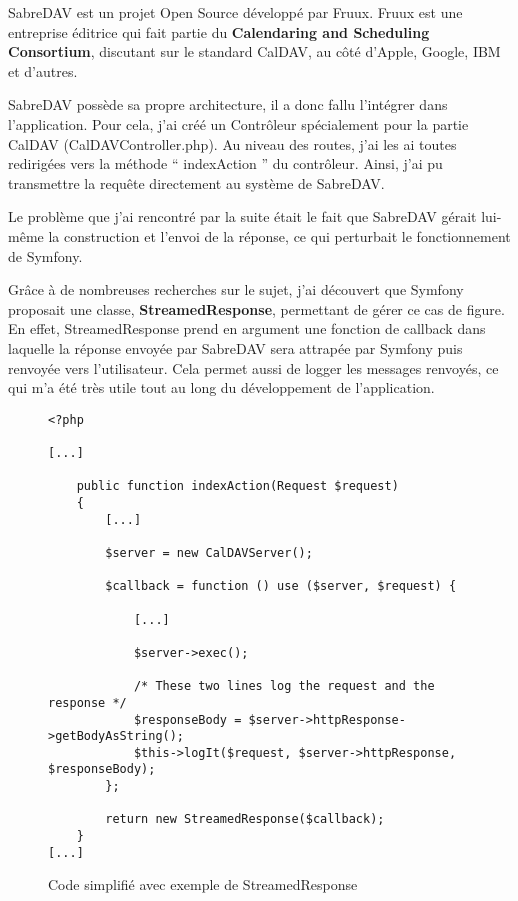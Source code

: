 SabreDAV est un projet Open Source développé par Fruux. Fruux est une entreprise éditrice qui fait partie du \textbf{Calendaring and Scheduling Consortium}, discutant sur le standard CalDAV, au côté d'Apple, Google, IBM et d'autres.

SabreDAV possède sa propre architecture, il a donc fallu l'intégrer dans l'application. Pour cela, j'ai créé un Contrôleur spécialement pour la partie CalDAV (CalDAVController.php). Au niveau des routes, j'ai les ai toutes redirigées vers la méthode `` indexAction '' du contrôleur. Ainsi, j'ai pu transmettre la requête directement au système de SabreDAV.

Le problème que j'ai rencontré par la suite était le fait que SabreDAV gérait lui-même la construction et l'envoi de la réponse, ce qui perturbait le fonctionnement de Symfony.

Grâce à de nombreuses recherches sur le sujet, j'ai découvert que Symfony proposait une classe, \textbf{StreamedResponse}, permettant de gérer ce cas de figure. En effet, StreamedResponse prend en argument une fonction de callback dans laquelle la réponse envoyée par SabreDAV sera attrapée par Symfony puis renvoyée vers l'utilisateur. Cela permet aussi de logger les messages renvoyés, ce qui m'a été très utile tout au long du développement de l'application.

\begin{figure}[H]
\begin{lstlisting}[frame=single]
<?php

[...]

    public function indexAction(Request $request)
    {
        [...]

        $server = new CalDAVServer();

        $callback = function () use ($server, $request) {

            [...]

            $server->exec();

            /* These two lines log the request and the response */
            $responseBody = $server->httpResponse->getBodyAsString();
            $this->logIt($request, $server->httpResponse, $responseBody);
        };

        return new StreamedResponse($callback);
    }
[...]

\end{lstlisting}
\caption{Code simplifié avec exemple de StreamedResponse}
\end{figure}

